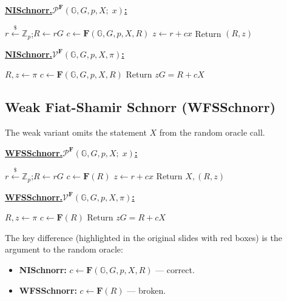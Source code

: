 \documentclass[11pt]{article}
\theoremstyle{plain}
\theoremstyle{definition}
\newcommand{\Z}{\mathbb{Z}}
\newcommand{\G}{\mathbb{G}}
\newcommand{\samplefrom}{\xleftarrow{\$}}
\newcommand{\Pro}{\mathcal{P}}
\newcommand{\Ver}{\mathcal{V}}
\newcommand{\RO}{\mathbf{F}}   %
\begin{document}
\begin{tcolorbox}[title={NISchnorr (correct Fiat-Shamir)},
                  colback=blue!5, colframe=blue!40!black]
\textbf{\underline{NISchnorr.$\Pro^{\RO}(\G, G, p, X;\; x)$:}}
\begin{algorithmic}[1]
  \State $r \samplefrom \Z_p$;\quad $R \leftarrow rG$
  \State $c \leftarrow \RO(\G, G, p, X, R)$  
  \State $z \leftarrow r + cx$
  \State Return $(R, z)$
\end{algorithmic}

\medskip
\textbf{\underline{NISchnorr.$\Ver^{\RO}(\G, G, p, X, \pi)$:}}
\begin{algorithmic}[1]
  \State $R, z \leftarrow \pi$
  \State $c \leftarrow \RO(\G, G, p, X, R)$  
  \State Return $zG = R + cX$
\end{algorithmic}
\end{tcolorbox}

\subsection{Weak Fiat-Shamir Schnorr (WFSSchnorr)}

The weak variant omits the statement $X$ from the random oracle call.

\begin{tcolorbox}[title={WFSSchnorr (weak / broken Fiat-Shamir)},
                  colback=red!5, colframe=red!50!black]
\textbf{\underline{WFSSchnorr.$\Pro^{\RO}(\G, G, p, X;\; x)$:}}
\begin{algorithmic}[1]
  \State $r \samplefrom \Z_p$;\quad $R \leftarrow rG$
  \State $c \leftarrow \RO(R)$  
  \State $z \leftarrow r + cx$
  \State Return $X, (R, z)$
\end{algorithmic}

\medskip
\textbf{\underline{WFSSchnorr.$\Ver^{\RO}(\G, G, p, X, \pi)$:}}
\begin{algorithmic}[1]
  \State $R, z \leftarrow \pi$
  \State $c \leftarrow \RO(R)$  
  \State Return $zG = R + cX$
\end{algorithmic}
\end{tcolorbox}

\noindent The key difference (highlighted in the original slides with red boxes)
is the argument to the random oracle:
\begin{itemize}
  \item \textbf{NISchnorr:} $c \leftarrow \RO(\G, G, p, X, R)$ --- correct.
  \item \textbf{WFSSchnorr:} $c \leftarrow \RO(R)$ --- broken.
\end{itemize}
\end{document}
